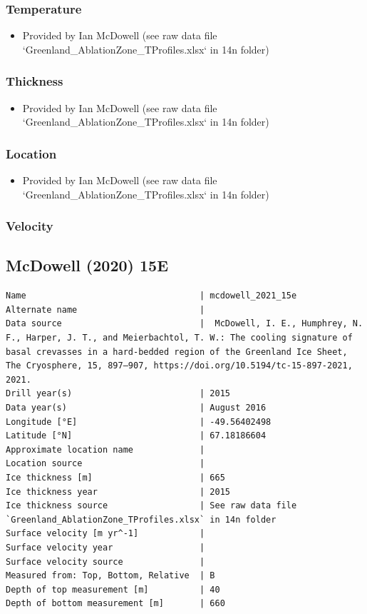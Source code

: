 \documentclass[article,a4paper,times,11pt,twoside]{article}
\begin{document}
\subsubsection{Temperature}
\label{sec:org9da1958}

\begin{itemize}
\item Provided by Ian McDowell (see raw data file `Greenland\_AblationZone\_TProfiles.xlsx` in 14n folder)
\end{itemize}

\subsubsection{Thickness}
\label{sec:org7536573}

\begin{itemize}
\item Provided by Ian McDowell (see raw data file `Greenland\_AblationZone\_TProfiles.xlsx` in 14n folder)
\end{itemize}

\subsubsection{Location}
\label{sec:org25d12d4}

\begin{itemize}
\item Provided by Ian McDowell (see raw data file `Greenland\_AblationZone\_TProfiles.xlsx` in 14n folder)
\end{itemize}

\subsubsection{Velocity}
\label{sec:org465f77c}
\clearpage
\subsection{McDowell (2020) 15E}
\label{sec:orgd0e6603}
\begin{verbatim}
Name                                  | mcdowell_2021_15e
Alternate name                        | 
Data source                           |  McDowell, I. E., Humphrey, N. F., Harper, J. T., and Meierbachtol, T. W.: The cooling signature of basal crevasses in a hard-bedded region of the Greenland Ice Sheet, The Cryosphere, 15, 897–907, https://doi.org/10.5194/tc-15-897-2021, 2021.
Drill year(s)                         | 2015
Data year(s)                          | August 2016
Longitude [°E]                        | -49.56402498
Latitude [°N]                         | 67.18186604
Approximate location name             | 
Location source                       | 
Ice thickness [m]                     | 665
Ice thickness year                    | 2015
Ice thickness source                  | See raw data file `Greenland_AblationZone_TProfiles.xlsx` in 14n folder
Surface velocity [m yr^-1]            | 
Surface velocity year                 | 
Surface velocity source               | 
Measured from: Top, Bottom, Relative  | B
Depth of top measurement [m]          | 40
Depth of bottom measurement [m]       | 660
\end{verbatim}
\end{document}
